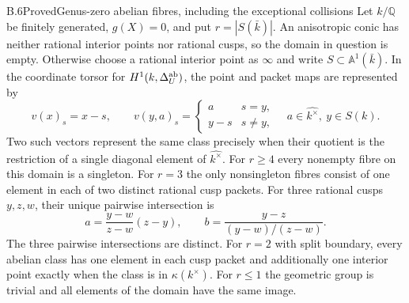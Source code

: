 \begin{statement}{B.6}{Proved}{Genus-zero abelian fibres, including the exceptional collisions}
Let $k/\mathbb Q$ be finitely generated, $g(X)=0$, and put
$r=|S(\bar k)|$.  An anisotropic conic has neither rational interior
points nor rational cusps, so the domain in question is empty.
Otherwise choose a rational interior point as $\infty$ and write
$S\subset\mathbb A^1(\bar k)$.  In the coordinate torsor for
$H^1(k,\Delta_U^{\rm ab})$, the point and packet maps are represented by
\[
 v(x)_s=x-s,\qquad
 v(y,a)_s=\begin{cases}a&s=y,\\y-s&s\ne y,\end{cases}
 \quad a\in\widehat{k^\times},\ y\in S(k).
\]
Two such vectors represent the same class precisely when their
quotient is the restriction of a single diagonal element of
$\widehat{k^\times}$.
For $r\geq4$ every nonempty fibre on this domain is a singleton.  For $r=3$ the
only nonsingleton fibres consist of one element in each of two distinct
rational cusp packets.  For three rational cusps $y,z,w$, their unique
pairwise intersection is
\[
 a=\frac{y-w}{z-w}(z-y),\qquad
 b=\frac{y-z}{(y-w)/(z-w)}.
\]
The three pairwise intersections are distinct.  For $r=2$ with split
boundary, every abelian class has one element in each cusp packet and
additionally one interior point exactly when the class is in
$\kappa(k^\times)$.  For $r\leq1$ the geometric group is trivial and
all elements of the domain have the same image.
\end{statement}
